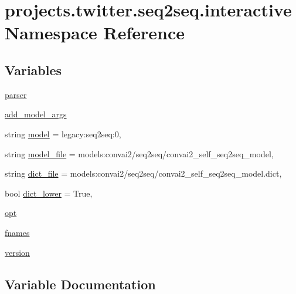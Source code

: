 \hypertarget{namespaceprojects_1_1twitter_1_1seq2seq_1_1interactive}{}\section{projects.\+twitter.\+seq2seq.\+interactive Namespace Reference}
\label{namespaceprojects_1_1twitter_1_1seq2seq_1_1interactive}
\subsection*{Variables}
\begin{DoxyCompactItemize}
\item 
\hyperlink{namespaceprojects_1_1twitter_1_1seq2seq_1_1interactive_acec6c52128a1d95d140ca9cd1e82b16d}{parser}
\item 
\hyperlink{namespaceprojects_1_1twitter_1_1seq2seq_1_1interactive_ace9452812c510cb14b2203a52777cb88}{add\+\_\+model\+\_\+args}
\item 
string \hyperlink{namespaceprojects_1_1twitter_1_1seq2seq_1_1interactive_ac91bd9b93ca47511e9d56016b4dd9ff8}{model} = \textquotesingle{}legacy\+:seq2seq\+:0\textquotesingle{},
\item 
string \hyperlink{namespaceprojects_1_1twitter_1_1seq2seq_1_1interactive_a435ff4e8d470ccfd5dfb9d02860e0843}{model\+\_\+file} = \textquotesingle{}models\+:convai2/seq2seq/convai2\+\_\+self\+\_\+seq2seq\+\_\+model\textquotesingle{},
\item 
string \hyperlink{namespaceprojects_1_1twitter_1_1seq2seq_1_1interactive_a3521787170187cd3f5c784d03ad447ed}{dict\+\_\+file} = \textquotesingle{}models\+:convai2/seq2seq/convai2\+\_\+self\+\_\+seq2seq\+\_\+model.\+dict\textquotesingle{},
\item 
bool \hyperlink{namespaceprojects_1_1twitter_1_1seq2seq_1_1interactive_a64565658298d391a0f781f40a9667215}{dict\+\_\+lower} = True,
\item 
\hyperlink{namespaceprojects_1_1twitter_1_1seq2seq_1_1interactive_a7d4ee83d3b3bdf88e548b4c3550e057e}{opt}
\item 
\hyperlink{namespaceprojects_1_1twitter_1_1seq2seq_1_1interactive_ad6aa507e2672f5cd8955efedecebecc4}{fnames}
\item 
\hyperlink{namespaceprojects_1_1twitter_1_1seq2seq_1_1interactive_a38d3b91fe6745c930dcda52bb7f6fd53}{version}
\end{DoxyCompactItemize}


\subsection{Variable Documentation}
\mbox{\label{namespaceprojects_1_1twitter_1_1seq2seq_1_1interactive_ace9452812c510cb14b2203a52777cb88}} 
